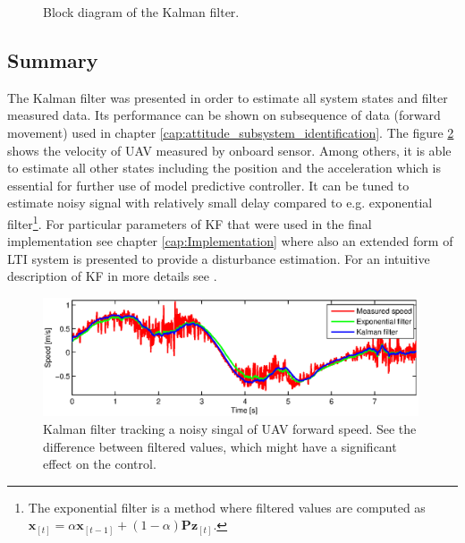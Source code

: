 \begin{figure}
\caption{Block diagram of the Kalman filter.}
\label{fig:kalman_diagram}
\end{figure}

\subsection{Summary}

The Kalman filter was presented in order to estimate all system states and filter measured data. Its performance can be shown on subsequence of data (forward movement) used in chapter \ref{cap:attitude_subsystem_identification}. The figure \ref{fig:kalman1} shows the velocity of UAV measured by onboard sensor. Among others, it is able to estimate all other states including the position and the acceleration which is essential for further use of model predictive controller. It can be tuned to estimate noisy signal with relatively small delay compared to e.g. exponential filter\footnote{The exponential filter is a method where filtered values are computed as $\textbf{\^x}_{[t]} = \alpha\textbf{\^x}_{[t-1]} + (1-\alpha)\textbf{P}\textbf{z}_{[t]}$.}. For particular parameters of KF that were used in the final implementation see chapter \ref{cap:Implementation} where also an extended form of LTI system is presented to provide a disturbance estimation. For an intuitive description of KF in more details see \citep{faragher2012understandingKF}.

\begin{figure}[h]
\includegraphics[width=0.99\textwidth]{fig/kalman1.eps} 
\caption{Kalman filter tracking a noisy singal of UAV forward speed. See the difference between filtered values, which might have a significant effect on the control.}
\label{fig:kalman1}
\end{figure}